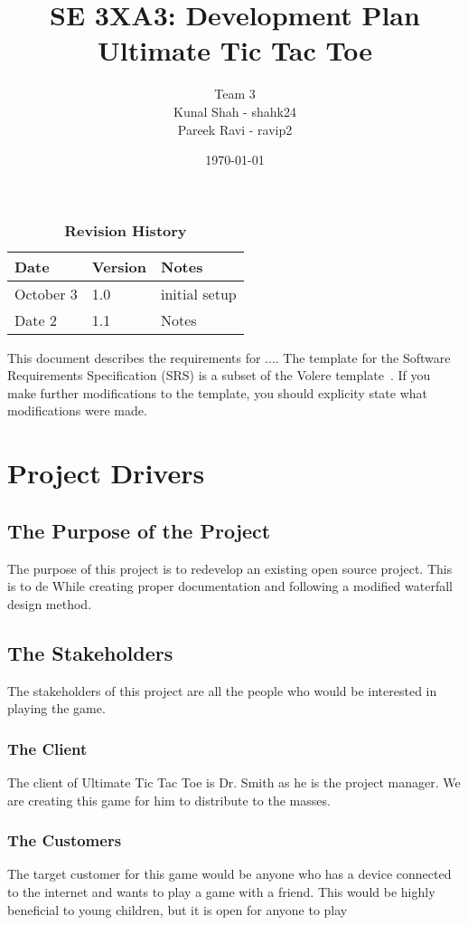 \documentclass[12pt, titlepage]{article}
\title{SE 3XA3: Development Plan\\Ultimate Tic Tac Toe}
\author{Team 3
		\\ Kunal Shah - shahk24
		\\ Pareek Ravi - ravip2
}
\date{\today}
\begin{document}
\maketitle

\tableofcontents
\listoftables
\listoffigures

\begin{table}[bp]
\caption{\bf Revision History}
\begin{tabularx}{\textwidth}{p{3cm}p{2cm}X}
\toprule {\bf Date} & {\bf Version} & {\bf Notes}\\
\midrule
October 3 & 1.0 & initial setup\\
Date 2 & 1.1 & Notes\\
\bottomrule
\end{tabularx}
\end{table}

\newpage


This document describes the requirements for ....  The template for the Software
Requirements Specification (SRS) is a subset of the Volere
template~\citep{RobertsonAndRobertson2012}.  If you make further modifications
to the template, you should explicity state what modifications were made.

\section{Project Drivers}

\subsection{The Purpose of the Project}
The purpose of this project is to redevelop an existing open source project. This is to de While creating proper documentation and following a modified waterfall design method.
\subsection{The Stakeholders}
The stakeholders of this project are all the people who would be interested in playing the game.
\subsubsection{The Client}
The client of Ultimate Tic Tac Toe is Dr. Smith as he is the project manager. We are creating this game for him to distribute to the masses.
\subsubsection{The Customers}
The target customer for this game would be anyone who has a device connected to the internet and wants to play a game with a friend. This would be highly beneficial to young children, but it is open for anyone to play
\end{document}
